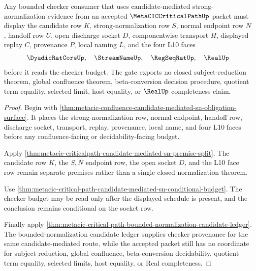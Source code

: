 \begin{theorem}
\label{thm:metacic-critical-path-four-face-bounded-checker-gate}
Any bounded checker consumer that uses candidate-mediated strong-normalization evidence from an accepted $\MetaCICCriticalPathUp$ packet must display the candidate row $K$, strong-normalization row $S$, normal endpoint row $N$, handoff row $U$, open discharge socket $D$, componentwise transport $H$, displayed replay $C$, provenance $P$, local naming $L$, and the four L10 faces
$$
\DyadicRatCoreUp,\quad \StreamNameUp,\quad \RegSeqRatUp,\quad \RealUp
$$
before it reads the checker budget. The gate exports no closed subject-reduction theorem, global confluence theorem, beta-conversion decision procedure, quotient term equality, selected limit, host equality, or $\RealUp$ completeness claim.
\end{theorem}
\begin{proof}
Begin with \autoref{thm:metacic-confluence-candidate-mediated-sn-obligation-surface}. It places the strong-normalization row, normal endpoint, handoff row, discharge socket, transport, replay, provenance, local name, and four L10 faces before any confluence-facing or decidability-facing budget.

Apply \autoref{thm:metacic-criticalpath-candidate-mediated-sn-premise-split}. The candidate row $K$, the $S,N$ endpoint row, the open socket $D$, and the L10 face row remain separate premises rather than a single closed normalization theorem.

Use \autoref{thm:metacic-critical-path-candidate-mediated-sn-conditional-budget}. The checker budget may be read only after the displayed schedule is present, and the conclusion remains conditional on the socket row.

Finally apply \autoref{thm:metacic-critical-path-bounded-normalization-candidate-ledger}. The bounded-normalization candidate ledger supplies checker provenance for the same candidate-mediated route, while the accepted packet still has no coordinate for subject reduction, global confluence, beta-conversion decidability, quotient term equality, selected limits, host equality, or Real completeness.
\end{proof}

